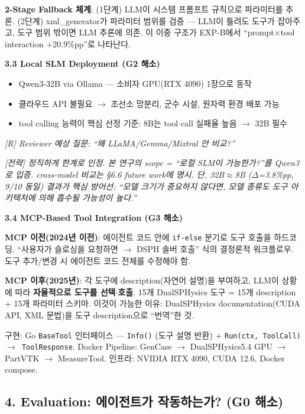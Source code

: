 \documentclass[12pt,a4paper]{article}
\begin{document}
\textbf{2-Stage Fallback 체계}:
(1단계) LLM이 시스템 프롬프트 규칙으로 파라미터를 추론.
(2단계) xml\_generator가 파라미터 범위를 검증 ---
LLM이 틀려도 도구가 잡아주고, 도구 범위 밖이면 LLM 추론에 의존.
이 이중 구조가 EXP-B에서 ``prompt$\times$tool interaction +20.9\%pp''로 나타난다.

\textbf{3.3 Local SLM Deployment (G2 해소)}

\begin{itemize}[nosep]
\item Qwen3-32B via Ollama --- 소비자 GPU(RTX 4090) 1장으로 동작
\item 클라우드 API 불필요 $\rightarrow$ 조선소 망분리, 군수 시설, 원자력 환경 배포 가능
\item tool calling 능력이 핵심 선정 기준: 8B는 tool call 실패율 높음 $\rightarrow$ 32B 필수
\end{itemize}

{\color{reviewer}\textit{[R] Reviewer 예상 질문: ``왜 LLaMA/Gemma/Mixtral 안 비교?''}}

{\color{strategy}\textit{[전략] 정직하게 한계로 인정.
본 연구의 scope = ``로컬 SLM이 가능한가?''를 Qwen3로 입증.
cross-model 비교는 §6.6 future work에 명시.
단, 32B$\approx$8B ($\Delta$=3.8\%pp, 9/10 동일) 결과가 핵심 방어선:
``모델 크기가 중요하지 않다면, 모델 종류도 도구 아키텍처에 의해 흡수될 가능성이 높다.''}}

\textbf{3.4 MCP-Based Tool Integration (G3 해소)}

\textbf{MCP 이전(2024년 이전)}:
에이전트 코드 안에 \texttt{if-else} 분기로 도구 호출을 하드코딩.
``사용자가 슬로싱을 요청하면 $\rightarrow$ DSPH 솔버 호출'' 식의 결정론적 워크플로우.
도구 추가/변경 시 에이전트 코드 전체를 수정해야 함.

\textbf{MCP 이후(2025년)}:
각 도구에 description(자연어 설명)을 부여하고,
LLM이 상황에 따라 \textbf{자율적으로 도구를 선택$\cdot$호출}.
15개 DualSPHysics 도구 = 15개 description + 15개 파라미터 스키마.
이것이 가능한 이유: DualSPHysics documentation(CUDA API, XML 문법)을
도구 description으로 ``번역''한 것.

구현: Go \texttt{BaseTool} 인터페이스 ---
\texttt{Info()} (도구 설명 반환) + \texttt{Run(ctx, ToolCall) $\rightarrow$ ToolResponse}.
Docker Pipeline: GenCase $\rightarrow$ DualSPHysics5.4 GPU $\rightarrow$ PartVTK $\rightarrow$ MeasureTool.
인프라: NVIDIA RTX 4090, CUDA 12.6, Docker compose.

\subsection{4. Evaluation: 에이전트가 작동하는가? (G0 해소)}
\end{document}
